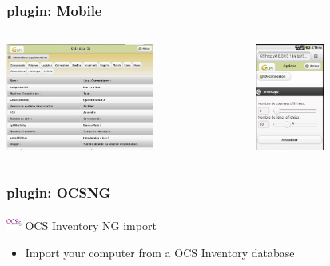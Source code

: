 \documentclass{beamer}
\begin{document}
\begin{frame}
    \frametitle{plugin: Mobile}

 \begin{columns}
 \begin{column}{0.5\textwidth}
    \includegraphics[height=3.5cm]{./pics/mobile/computer_detail_tablet.jpg}
 \end{column}
 \begin{column}{0.5\textwidth}
   \includegraphics[height=3.5cm]{./pics/mobile/options.jpg}
 \end{column}
\end{columns}

\end{frame}



\begin{frame}
    \frametitle{plugin: OCSNG}

    
    \begin{block}{\includegraphics[height=0.5cm]{./pics/plugins/ocsinventory.jpg} OCS Inventory NG import}
        \begin{itemize}
            \item Import your computer from a OCS Inventory database 
        \end{itemize}
    \end{block}

\end{frame}
\end{document}
